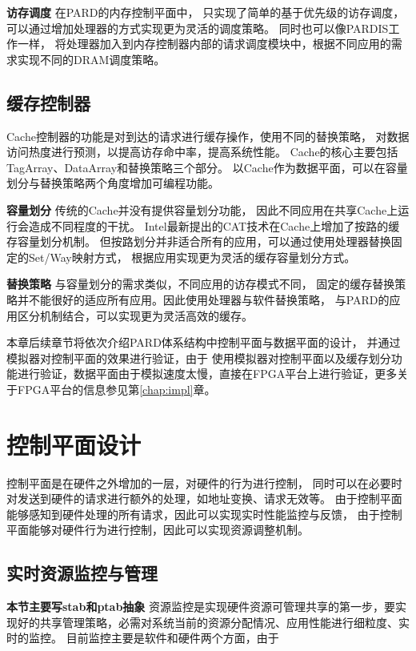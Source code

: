 \textbf{访存调度}\quad
在PARD的内存控制平面中，
只实现了简单的基于优先级的访存调度，可以通过增加处理器的方式实现更为灵活的调度策略。
同时也可以像PARDIS\cite{bojnordi_pardis:_2012}工作一样，
将处理器加入到内存控制器内部的请求调度模块中，根据不同应用的需求实现不同的DRAM调度策略。

\subsection{缓存控制器}
Cache控制器的功能是对到达的请求进行缓存操作，使用不同的替换策略，
对数据访问热度进行预测，以提高访存命中率，提高系统性能。
Cache的核心主要包括TagArray、DataArray和替换策略三个部分。
以Cache作为数据平面，可以在容量划分与替换策略两个角度增加可编程功能。

\textbf{容量划分}\quad
传统的Cache并没有提供容量划分功能，
因此不同应用在共享Cache上运行会造成不同程度的干扰。
Intel最新提出的CAT技术\cite{intel-cat}在Cache上增加了按路的缓存容量划分机制。
但按路划分并非适合所有的应用，可以通过使用处理器替换固定的Set/Way映射方式，
根据应用实现更为灵活的缓存容量划分方式。

\textbf{替换策略}\quad
与容量划分的需求类似，不同应用的访存模式不同，
固定的缓存替换策略并不能很好的适应所有应用。因此使用处理器与软件替换策略，
与PARD的应用区分机制结合，可以实现更为灵活高效的缓存。

本章后续章节将依次介绍PARD体系结构中控制平面与数据平面的设计，
并通过模拟器对控制平面的效果进行验证，由于
使用模拟器对控制平面以及缓存划分功能进行验证，数据平面由于模拟速度太慢，直接在FPGA平台上进行验证，更多关于FPGA平台的信息参见第\ref{chap:impl}章。

\section{控制平面设计}

控制平面是在硬件之外增加的一层，对硬件的行为进行控制，
同时可以在必要时对发送到硬件的请求进行额外的处理，如地址变换、请求无效等。
由于控制平面能够感知到硬件处理的所有请求，因此可以实现实时性能监控与反馈，
由于控制平面能够对硬件行为进行控制，因此可以实现资源调整机制。

\subsection{实时资源监控与管理}
\textbf{本节主要写stab和ptab抽象}
资源监控是实现硬件资源可管理共享的第一步，要实现好的共享管理策略，必需对系统当前的资源分配情况、应用性能进行细粒度、实时的监控。
目前监控主要是软件和硬件两个方面，由于

